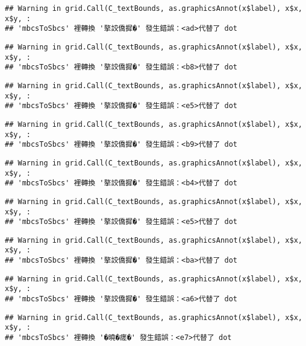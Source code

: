 \documentclass[
]{article}
\begin{document}
\begin{verbatim}
## Warning in grid.Call(C_textBounds, as.graphicsAnnot(x$label), x$x, x$y, :
## 'mbcsToSbcs' 裡轉換 '摮詨僑摨�' 發生錯誤：<ad>代替了 dot
\end{verbatim}

\begin{verbatim}
## Warning in grid.Call(C_textBounds, as.graphicsAnnot(x$label), x$x, x$y, :
## 'mbcsToSbcs' 裡轉換 '摮詨僑摨�' 發生錯誤：<b8>代替了 dot
\end{verbatim}

\begin{verbatim}
## Warning in grid.Call(C_textBounds, as.graphicsAnnot(x$label), x$x, x$y, :
## 'mbcsToSbcs' 裡轉換 '摮詨僑摨�' 發生錯誤：<e5>代替了 dot
\end{verbatim}

\begin{verbatim}
## Warning in grid.Call(C_textBounds, as.graphicsAnnot(x$label), x$x, x$y, :
## 'mbcsToSbcs' 裡轉換 '摮詨僑摨�' 發生錯誤：<b9>代替了 dot
\end{verbatim}

\begin{verbatim}
## Warning in grid.Call(C_textBounds, as.graphicsAnnot(x$label), x$x, x$y, :
## 'mbcsToSbcs' 裡轉換 '摮詨僑摨�' 發生錯誤：<b4>代替了 dot
\end{verbatim}

\begin{verbatim}
## Warning in grid.Call(C_textBounds, as.graphicsAnnot(x$label), x$x, x$y, :
## 'mbcsToSbcs' 裡轉換 '摮詨僑摨�' 發生錯誤：<e5>代替了 dot
\end{verbatim}

\begin{verbatim}
## Warning in grid.Call(C_textBounds, as.graphicsAnnot(x$label), x$x, x$y, :
## 'mbcsToSbcs' 裡轉換 '摮詨僑摨�' 發生錯誤：<ba>代替了 dot
\end{verbatim}

\begin{verbatim}
## Warning in grid.Call(C_textBounds, as.graphicsAnnot(x$label), x$x, x$y, :
## 'mbcsToSbcs' 裡轉換 '摮詨僑摨�' 發生錯誤：<a6>代替了 dot
\end{verbatim}

\begin{verbatim}
## Warning in grid.Call(C_textBounds, as.graphicsAnnot(x$label), x$x, x$y, :
## 'mbcsToSbcs' 裡轉換 '�曉�瘥�' 發生錯誤：<e7>代替了 dot
\end{verbatim}
\end{document}

